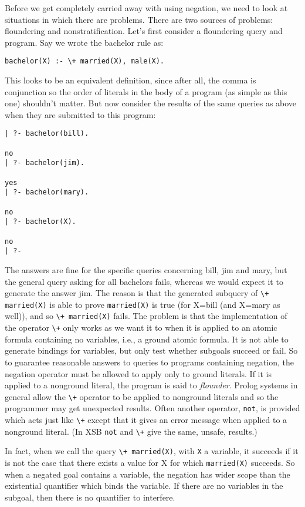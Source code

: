 Before we get completely carried away with using negation, we need to
look at situations in which there are problems.  There are two sources
of problems: floundering and nonstratification.  Let's first consider
a floundering query and program.  Say we wrote the bachelor rule as:
\begin{verbatim}
bachelor(X) :- \+ married(X), male(X).
\end{verbatim}
This looks to be an equivalent definition, since after all, the comma
is conjunction so the order of literals in the body of a program (as
simple as this one) shouldn't matter.  But now consider the results of
the same queries as above when they are submitted to this program:
\begin{verbatim}
| ?- bachelor(bill).

no
| ?- bachelor(jim).

yes
| ?- bachelor(mary).

no
| ?- bachelor(X).

no
| ?- 
\end{verbatim}
The answers are fine for the specific queries concerning bill, jim and
mary, but the general query asking for all bachelors fails, whereas we
would expect it to generate the answer jim.  The reason is that the
generated subquery of \verb|\+ married(X)| is able to prove
\verb|married(X)| is true (for X=bill (and X=mary as well)), and so
\verb|\+ married(X)| fails.  The problem is that the
implementation of the operator \verb|\+| only works as we want it to
when it is applied to an atomic formula containing no variables, i.e.,
a ground atomic formula.  It is not able to generate bindings for
variables, but only test whether subgoals succeed or fail.  So to
guarantee reasonable answers to queries to programs containing
negation, the negation operator must be allowed to apply only to
ground literals.  If it is applied to a nonground literal, the program
is said to {\em flounder}.  Prolog systems in general allow the
\verb|\+| operator to be applied to nonground literals and so the
programmer may get unexpected results.  Often another operator,
\verb|not|, is provided which acts just like \verb|\+| except that it
gives an error message when applied to a nonground literal. (In XSB
\verb|not| and \verb|\+| give the same, unsafe, results.)

In fact, when we call the query \verb|\+ married(X)|, with \verb|X| a
variable, it succeeds if it is not the case that there exists a value
for X for which \verb|married(X)| succeeds.  So when a negated goal
contains a variable, the negation has wider scope than the existential
quantifier which binds the variable.  If there are no variables in the
subgoal, then there is no quantifier to interfere.

